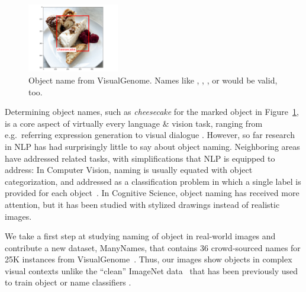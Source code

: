 \begin{figure}[tbp]
\begin{center}
\includegraphics[height=3cm]{figures/cheesecake.png}
\caption{Object name from VisualGenome. Names like , , , or  would be valid, too.}
\label{fig:cake}
\end{center}
\vspace{-0.5cm}
\end{figure}

Determining object names, such as \emph{cheesecake} for the marked object in Figure~\ref{fig:cake}, is a core aspect of virtually every language \& vision task, ranging from e.g.\ referring expression generation to visual dialogue \cite{fangetal:2015,devlin:imcaqui,Bernardietal:automatic,das2017visual,vries2017guesswhat}.
However, so far research in NLP has had surprisingly little to say about object naming.
Neighboring areas
have addressed related tasks, with simplifications that NLP is equipped to address:
In Computer Vision, naming is usually equated with object categorization, and addressed as a classification problem in which a single label is provided for each object~\cite{googlenet}.
In Cognitive Science, object naming has received more attention, but it has been studied with stylized drawings instead of realistic images.

We take a first step at studying naming of object in real-world images and contribute a new dataset, ManyNames, that contains 36 crowd-sourced names for 25K instances from VisualGenome~\cite{krishna2016visualgenome}.
Thus, our images show objects in complex visual contexts
unlike the ``clean'' ImageNet data~\cite{imagenet_cvpr09} that has been previously used to train object or name classifiers \cite{Ordonez:2016}.

